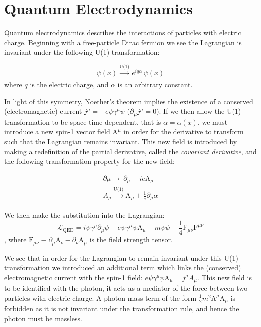 \section{Quantum Electrodynamics}

Quantum electrodynamics describes the interactions of particles with electric charge. Beginning with a free-particle Dirac fermion we see the Lagrangian is invariant under the following U(1) transformation:

\begin{equation}
\psi(x)  \xrightarrow[]{\text{U(1)}} e^{i q \alpha}\,\psi(x)
\label{eq:u1}
\end{equation}
where $q$ is the electric charge, and $\alpha$ is an arbitrary constant.

In light of this symmetry, Noether's theorem implies the existence of a conserved (electromagnetic) current $j^{\mu} = -e\bar{\psi}\gamma^{\mu}\psi$ ($\partial_{\mu}j^{\mu}=0$). If we then allow the U(1) transformation to be space-time dependent, that is $\alpha = \alpha(x)$, we must introduce a new spin-1 vector field A$^{\mu}$ in order for the derivative to transform such that the Lagrangian remains invariant. This new field is introduced by making a redefinition of the partial derivative, called the \textit{covariant derivative}, and the following transformation property for the new field:

\begin{equation}
\begin{array}{l}
\partial{\mu} \rightarrow\ \partial_{\mu} - ie\mathrm{A}_{\mu}
\\A_{\mu} \xrightarrow[]{\text{U(1)}} \mathrm{A}_{\mu} + \frac{1}{e} \partial_{\mu} \alpha
 \end{array}
\end{equation}

We then make the substitution into the Lagrangian:
\begin{equation}
\mathcal{L}_{\mathrm{QED}} =
i\bar{\psi}\gamma^{\mu}\partial_{\mu}\psi
- e\bar{\psi}\gamma^{\mu}\psi \mathrm{A}_{\mu}
- m\bar{\psi}\psi
- \frac{1}{4}\mathrm{F}_{\mu\nu} \mathrm{F}^{\mu\nu}
\end{equation},
where $\mathrm{F}_{\mu\nu}\equiv\partial_{\mu}\mathrm{A}_{\nu} - \partial_{\nu}\mathrm{A}_{\mu}$ is the field strength tensor.

We see that in order for the Lagrangian to remain invariant under this U(1) transformation we introduced an additional term which links the (conserved) electromagnetic current with the spin-1 field: $e\bar{\psi}\gamma^{\mu}\psi \mathrm{A}_{\mu} = j^{\mu}A_{\mu}$. This new field is to be identified with the photon, it acts as a mediator of the force between two particles with electric charge. A photon mass term of the form $\frac{1}{2}m^{2}\mathrm{A}^{\mu}\mathrm{A}_{\mu}$ is forbidden as it is not invariant under the transformation rule, and hence the photon must be massless.

